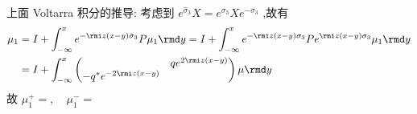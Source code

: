 \begin{remark}
    上面 Voltarra 积分的推导: 考虑到 $ e^{\hat{\sigma}_{3}} X = e^{\sigma_{3}} X e^{-\sigma_{3}} $ ,故有
    \begin{equation*}
        \begin{aligned}
            \mu_{1} & = I + \int_{-\infty}^{x} e^{- \rmi z(x-y) \hat{\sigma}_{3}} P \mu_{1} \rmd y = I + \int_{-\infty}^{x} e^{- \rmi z(x-y) \sigma_{3}} P e^{\rmi z(x-y) \sigma_{3}} \mu_{1} \rmd y \\
                    & = I + \int_{-\infty}^{x} \begin{pmatrix}
                                                    & qe^{2\rmi z(x-y)} \\ - q^{*}e^{-2\rmi z(x-y)}  &
                                               \end{pmatrix} \mu \rmd y
        \end{aligned}
    \end{equation*}
    故 $ \mu_{1}^{+} = , \quad \mu_{1}^{-} = $
\end{remark}
